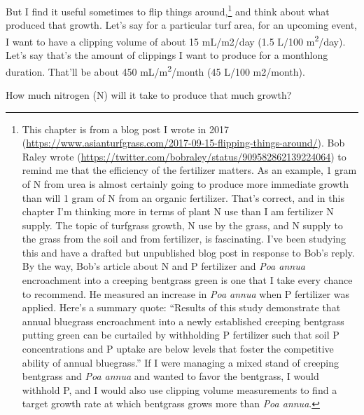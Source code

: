 \documentclass[12pt,b5,]{tufte-book}
\begin{document}
But I find it useful sometimes to flip things around,\footnote{This chapter is from a blog post I wrote in 2017 (\url{https://www.asianturfgrass.com/2017-09-15-flipping-things-around/}). Bob Raley wrote (\url{https://twitter.com/bobraley/status/909582862139224064}) to remind me that the efficiency of the fertilizer matters. As an example, 1 gram of N from urea is almost certainly going to produce more immediate growth than will 1 gram of N from an organic fertilizer. That's correct, and in this chapter I'm thinking more in terms of plant N use than I am fertilizer N supply. The topic of turfgrass growth, N use by the grass, and N supply to the grass from the soil and from fertilizer, is fascinating. I've been studying this and have a drafted but unpublished blog post in response to Bob's reply. By the way, Bob's article \citep{Raley2013} about N and P fertilizer and \emph{Poa annua} encroachment into a creeping bentgrass green is one that I take every chance to recommend. He measured an increase in \emph{Poa annua} when P fertilizer was applied. Here's a summary quote: ``Results of this study demonstrate that annual bluegrass encroachment into a newly established creeping bentgrass putting green can be curtailed by withholding P fertilizer such that soil P concentrations and P uptake are below levels that foster the competitive ability of annual bluegrass.'' If I were managing a mixed stand of creeping bentgrass and \emph{Poa annua} and wanted to favor the bentgrass, I would withhold P, and I would also use clipping volume measurements to find a target growth rate at which bentgrass grows more than \emph{Poa annua}.} and think about what produced that growth. Let's say for a particular turf area, for an upcoming event, I want to have a clipping volume of about 15 mL/m2/day (1.5 L/100 m\textsuperscript{2}/day). Let's say that's the amount of clippings I want to produce for a monthlong duration. That'll be about 450 mL/m\textsuperscript{2}/month (45 L/100 m2/month).

How much nitrogen (N) will it take to produce that much growth?
\end{document}
